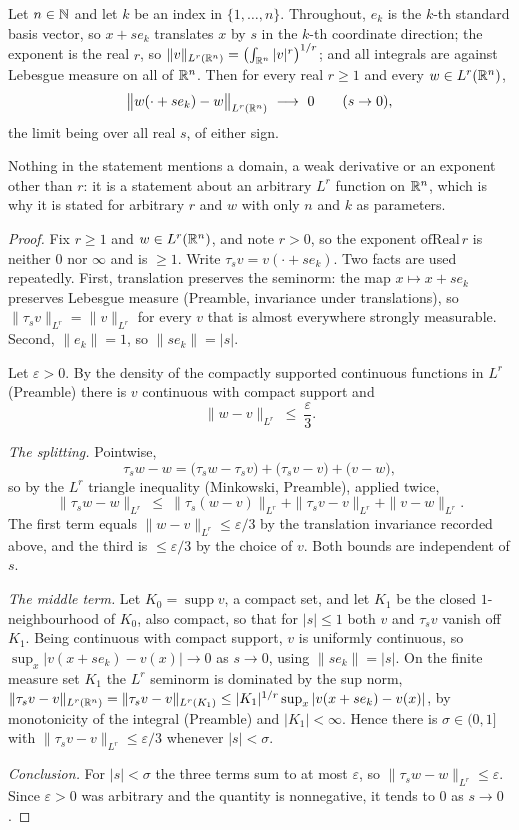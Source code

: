 \begin{helper}
Let $n\in\mathbb{N}$ and let $k$ be an index in $\{1,\dots,n\}$.  Throughout, $e_k$ is
the $k$-th standard basis vector, so $x+se_k$ translates $x$ by $s$ in the
$k$-th coordinate direction; the exponent is the real $r$, so
$\|v\|_{L^r(\mathbb{R}^n)}=\bigl(\int_{\mathbb{R}^n}|v|^{r}\bigr)^{1/r}$; and all integrals are
against Lebesgue measure on all of $\mathbb{R}^n$.  Then for every real $r\ge1$ and
every $w\in L^{r}(\mathbb{R}^n)$,
\[
\bigl\|w(\cdot+se_k)-w\bigr\|_{L^{r}(\R^n)}\ \longrightarrow\ 0
\qquad (s\to0),
\]
the limit being over all real $s$, of either sign.

Nothing in the statement mentions a domain, a weak derivative or an exponent
other than $r$: it is a statement about an arbitrary $L^r$ function on $\mathbb{R}^n$,
which is why it is stated for arbitrary $r$ and $w$ with only $n$ and $k$ as
parameters.
\end{helper}
\begin{proof}
Fix $r\ge1$ and $w\in L^{r}(\mathbb{R}^n)$, and note $r>0$, so the exponent
$\mathrm{ofReal}\,r$ is neither $0$ nor $\infty$ and is $\ge1$.  Write
$\tau_sv=v(\cdot+se_k)$.  Two facts are used repeatedly.  First, translation
preserves the seminorm: the map $x\mapsto x+se_k$ preserves Lebesgue measure
(Preamble, invariance under translations), so
$\|\tau_sv\|_{L^{r}}=\|v\|_{L^{r}}$ for every $v$ that is almost everywhere
strongly measurable.  Second, $\|e_k\|=1$, so $\|se_k\|=|s|$.

Let $\varepsilon>0$.  By the density of the compactly supported continuous
functions in $L^{r}$ (Preamble) there is $v$ continuous with compact support
and
\[
\|w-v\|_{L^{r}}\ \le\ \frac\varepsilon3 .
\]

\emph{The splitting.}  Pointwise,
\[
\tau_sw-w=\bigl(\tau_sw-\tau_sv\bigr)+\bigl(\tau_sv-v\bigr)+\bigl(v-w\bigr),
\]
so by the $L^{r}$ triangle inequality (Minkowski, Preamble), applied twice,
\[
\|\tau_sw-w\|_{L^{r}}
\ \le\ \|\tau_s(w-v)\|_{L^{r}}+\|\tau_sv-v\|_{L^{r}}+\|v-w\|_{L^{r}} .
\]
The first term equals $\|w-v\|_{L^{r}}\le\varepsilon/3$ by the translation
invariance recorded above, and the third is $\le\varepsilon/3$ by the choice of
$v$.  Both bounds are independent of $s$.

\emph{The middle term.}  Let $K_0=\operatorname{supp}v$, a compact set, and let
$K_1$ be the closed $1$-neighbourhood of $K_0$, also compact, so that for
$|s|\le1$ both $v$ and $\tau_sv$ vanish off $K_1$.  Being continuous with
compact support, $v$ is uniformly continuous, so
$\sup_x|v(x+se_k)-v(x)|\to0$ as $s\to0$, using $\|se_k\|=|s|$.  On the finite
measure set $K_1$ the $L^{r}$ seminorm is dominated by the sup norm,
$\|\tau_sv-v\|_{L^{r}(\mathbb{R}^n)}=\|\tau_sv-v\|_{L^{r}(K_1)}
  \le|K_1|^{1/r}\sup_x|v(x+se_k)-v(x)|$,
by monotonicity of the integral (Preamble) and $|K_1|<\infty$.  Hence there is
$\sigma\in(0,1]$ with $\|\tau_sv-v\|_{L^{r}}\le\varepsilon/3$ whenever
$|s|<\sigma$.

\emph{Conclusion.}  For $|s|<\sigma$ the three terms sum to at most
$\varepsilon$, so $\|\tau_sw-w\|_{L^{r}}\le\varepsilon$.  Since
$\varepsilon>0$ was arbitrary and the quantity is nonnegative, it tends to $0$
as $s\to0$.
\end{proof}
